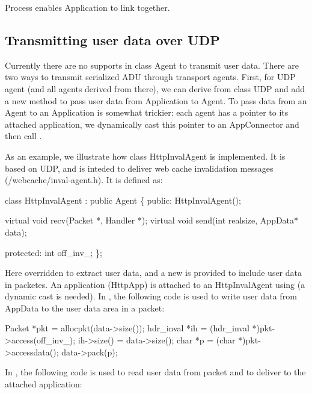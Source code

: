 Process enables Application to link together. 

\subsection{Transmitting user data over UDP}

Currently there are no supports in class Agent to transmit user
data. There are two ways to  transmit serialized ADU through transport
agents. First, for UDP agent (and all agents derived from there), we
can derive from class UDP and add a new method
 to pass user data from
Application to Agent. To pass data from an Agent to an Application is
somewhat trickier: each agent has a pointer to its attached
application, we dynamically cast this pointer to an AppConnector and
then call .

As an example, we illustrate how class HttpInvalAgent is
implemented. It is based on UDP, and is inteded to deliver web cache
invalidation messages (\ns/webcache/inval-agent.h). It is defined as:

\begin{program}
        class HttpInvalAgent : public Agent \{
        public: 
                HttpInvalAgent();

                virtual void recv(Packet *, Handler *);
                virtual void send(int realsize, AppData* data);

        protected:
                int off_inv_;
        \};
\end{program}

Here  overridden to extract user data,
and a new  is provided to include user data
in packetes. An application (HttpApp) is attached to an HttpInvalAgent
using  (a dynamic cast is needed). In
, the following code is used to write user data from
AppData to the user data area in a packet:

\begin{program}
        Packet *pkt = allocpkt(data->size());
        hdr_inval *ih = (hdr_inval *)pkt->access(off_inv_);
        ih->size() = data->size();
        char *p = (char *)pkt->accessdata();
        data->pack(p);
\end{program}

In , the following code is used to read user data from
packet and to deliver to the attached application:

